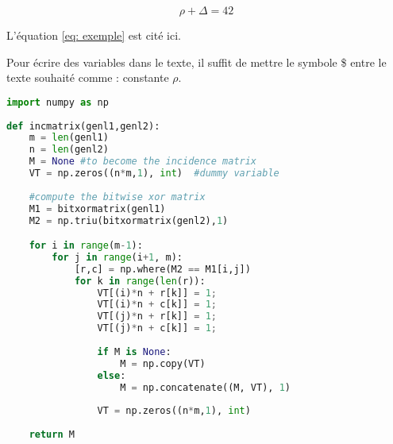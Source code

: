 \documentclass{rapportHenallux}
\begin{document}

\begin{equation} \label{eq: exemple}
\rho + \Delta = 42
\end{equation}

L'équation \ref{eq: exemple} est cité ici. 


Pour écrire des variables dans le texte, il suffit de mettre le symbole \$ entre le texte souhaité comme : constante $\rho$. 
\begin{lstlisting}[language=Python, title=test.py]
import numpy as np
    
def incmatrix(genl1,genl2):
    m = len(genl1)
    n = len(genl2)
    M = None #to become the incidence matrix
    VT = np.zeros((n*m,1), int)  #dummy variable
    
    #compute the bitwise xor matrix
    M1 = bitxormatrix(genl1)
    M2 = np.triu(bitxormatrix(genl2),1) 

    for i in range(m-1):
        for j in range(i+1, m):
            [r,c] = np.where(M2 == M1[i,j])
            for k in range(len(r)):
                VT[(i)*n + r[k]] = 1;
                VT[(i)*n + c[k]] = 1;
                VT[(j)*n + r[k]] = 1;
                VT[(j)*n + c[k]] = 1;
                
                if M is None:
                    M = np.copy(VT)
                else:
                    M = np.concatenate((M, VT), 1)
                
                VT = np.zeros((n*m,1), int)
    
    return M
\end{lstlisting}
\end{document}
